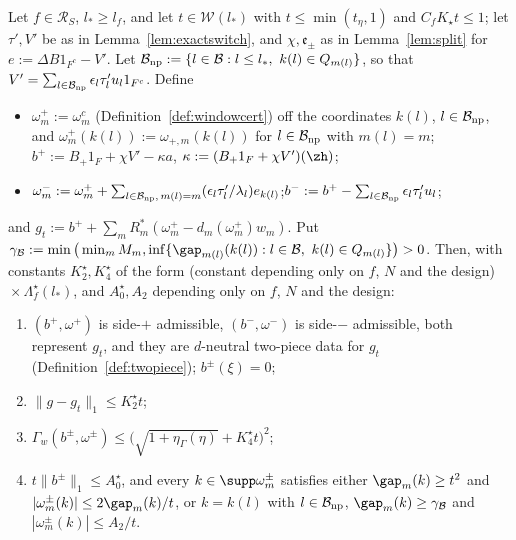 
\begin{lemma}\label{lem:windowtwopiece}
Let $f\in\mathcal R_S$, $l_*\ge l_f$, and let $t\in\mathcal W(l_*)$ with
$t\le\min(t_\eta,1)$ and $C_fK_\star t\le1$; let $\tau',V'$ be as in
Lemma~\ref{lem:exactswitch}, and $\chi,\mathfrak e_\pm$ as in
Lemma~\ref{lem:split} for $e:=\Delta B1_{F^c}-V'$.  Let $\mathcal B_{\rm np}
:=\{l\in\mathcal B:l\le l_*,\ k(l)\in Q_{m(l)}\}$, so that $V'=\sum_{l\in
\mathcal B_{\rm np}}\epsilon_l\tau'_lu_l1_{F^c}$.  Define
\begin{itemize}
\item[$+$:] $\omega^+_m:=\omega^c_m$ \textup{(}Definition~\ref{def:windowcert}\textup{)}
off the coordinates $k(l)$, $l\in\mathcal B_{\rm np}$, and
$\omega^+_m(k(l)):=\omega_{+,m}(k(l))$ for $l\in\mathcal B_{\rm np}$ with
$m(l)=m$;\quad $b^+:=B_+1_F+\chi V'-\kappa a$, $\kappa:=(B_+1_F+\chi V')(\zh)$;
\item[$-$:] $\omega^-_m:=\omega^+_m+\sum_{l\in\mathcal B_{\rm np},\,m(l)=m}
(\epsilon_l\tau'_l/\lambda_l)e_{k(l)}$;\quad $b^-:=b^+-\sum_{l\in\mathcal
B_{\rm np}}\epsilon_l\tau'_lu_l$;
\end{itemize}
and $g_t:=b^++\sum_mR_m^*(\omega^+_m-d_m(\omega^+_m)w_m)$.  Put
$\gamma_{\mathcal B}:=\min\big(\min_mM_m,\inf\{\gap_{m(l)}(k(l)):l\in
\mathcal B,\ k(l)\in Q_{m(l)}\}\big)>0$.  Then, with constants $K^\star_2,
K^\star_4$ of the form \textup{(}constant depending only on $f$, $N$ and the
design\textup{)}${}\times\Lambda^\star_f(l_*)$, and $A^\star_0,A_2$
depending only on $f$, $N$ and the design:
\begin{enumerate}
\item[(a)] $(b^+,\omega^+)$ is side-$+$ admissible, $(b^-,\omega^-)$ is
side-$-$ admissible, both represent $g_t$, and they are $d$-neutral
two-piece data for $g_t$ \textup{(}Definition~\ref{def:twopiece}\textup{)};
$b^\pm(\xi)=0$;
\item[(b)] $\|g-g_t\|_1\le K^\star_2t$;
\item[(c)] $\Gamma_w(b^\pm,\omega^\pm)\le\big(\sqrt{1+\eta_\Gamma(\eta)}+
K^\star_4t\big)^2$;
\item[(d)] $t\|b^\pm\|_1\le A^\star_0$, and every $k\in\supp\omega^\pm_m$
satisfies either $\gap_m(k)\ge t^2$ and $|\omega^\pm_m(k)|\le2\gap_m(k)/t$,
or $k=k(l)$ with $l\in\mathcal B_{\rm np}$, $\gap_m(k)\ge\gamma_{\mathcal B}$
and $|\omega^\pm_m(k)|\le A_2/t$.
\end{enumerate}
\end{lemma}

